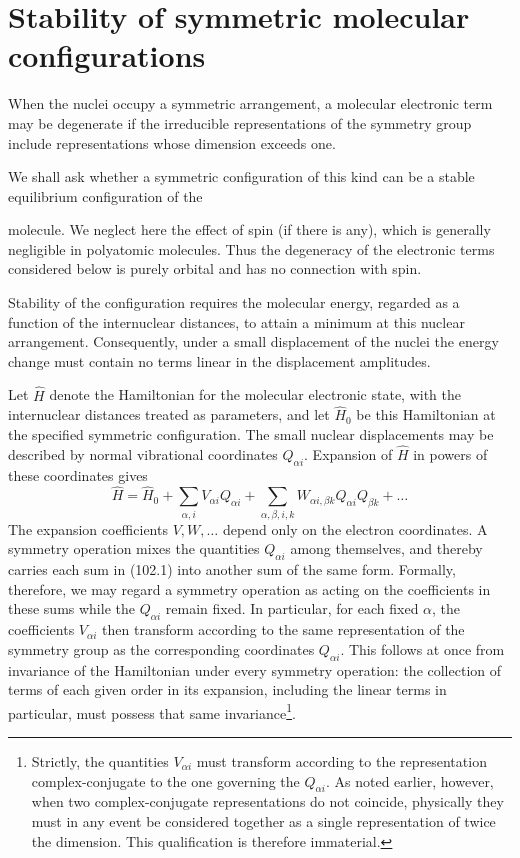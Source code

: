 \section{Stability of symmetric molecular configurations}

When the nuclei occupy a symmetric arrangement, a molecular electronic term may be degenerate if the irreducible representations of the symmetry group include representations whose dimension exceeds one.

We shall ask whether a symmetric configuration of this kind can be a stable equilibrium configuration of the

molecule. We neglect here the effect of spin (if there is any), which is generally negligible in polyatomic molecules. Thus the degeneracy of the electronic terms considered below is purely orbital and has no connection with spin.

Stability of the configuration requires the molecular energy, regarded as a function of the internuclear distances, to attain a minimum at this nuclear arrangement. Consequently, under a small displacement of the nuclei the energy change must contain no terms linear in the displacement amplitudes.

Let $\widehat H$ denote the Hamiltonian for the molecular electronic state, with the internuclear distances treated as parameters, and let $\widehat H_0$ be this Hamiltonian at the specified symmetric configuration. The small nuclear displacements may be described by normal vibrational coordinates $Q_{\alpha i}$. Expansion of $\widehat H$ in powers of these coordinates gives
\begin{equation}
 \widehat H=\widehat H_0+\sum_{\alpha,i}V_{\alpha i}Q_{\alpha i}
 +\sum_{\alpha,\beta,i,k}W_{\alpha i,\beta k}Q_{\alpha i}Q_{\beta k}+\ldots
 \tag{102.1}
\end{equation}
The expansion coefficients $V,W,\ldots$ depend only on the electron coordinates. A symmetry operation mixes the quantities $Q_{\alpha i}$ among themselves, and thereby carries each sum in (102.1) into another sum of the same form. Formally, therefore, we may regard a symmetry operation as acting on the coefficients in these sums while the $Q_{\alpha i}$ remain fixed. In particular, for each fixed $\alpha$, the coefficients $V_{\alpha i}$ then transform according to the same representation of the symmetry group as the corresponding coordinates $Q_{\alpha i}$. This follows at once from invariance of the Hamiltonian under every symmetry operation: the collection of terms of each given order in its expansion, including the linear terms in particular, must possess that same invariance\footnote{Strictly, the quantities $V_{\alpha i}$ must transform according to the representation complex-conjugate to the one governing the $Q_{\alpha i}$. As noted earlier, however, when two complex-conjugate representations do not coincide, physically they must in any event be considered together as a single representation of twice the dimension. This qualification is therefore immaterial.}.

